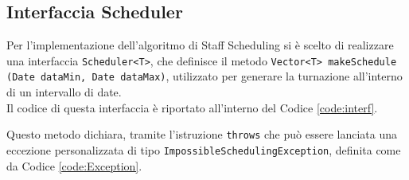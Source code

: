 \subsection{Interfaccia Scheduler}
Per l'implementazione dell'algoritmo di Staff Scheduling si è scelto di realizzare una interfaccia \verb|Scheduler<T>|, che definisce il metodo \verb|Vector<T> makeSchedule| \verb|(Date dataMin, Date dataMax)|, utilizzato per generare la turnazione all'interno di un intervallo di date.\\
Il codice di questa interfaccia è riportato all'interno del Codice \ref{code:interf}.
\lstset{
    caption=Interfaccia Scheduler,
    label=code:interf }

Questo metodo dichiara, tramite l'istruzione \verb|throws| che può essere lanciata una eccezione personalizzata di tipo \verb|ImpossibleSchedulingException|, definita come da Codice \ref{code:Exception}.
\lstset{
    caption=Eccezione ImpossibleSchedulingException,
    label=code:Exception }

